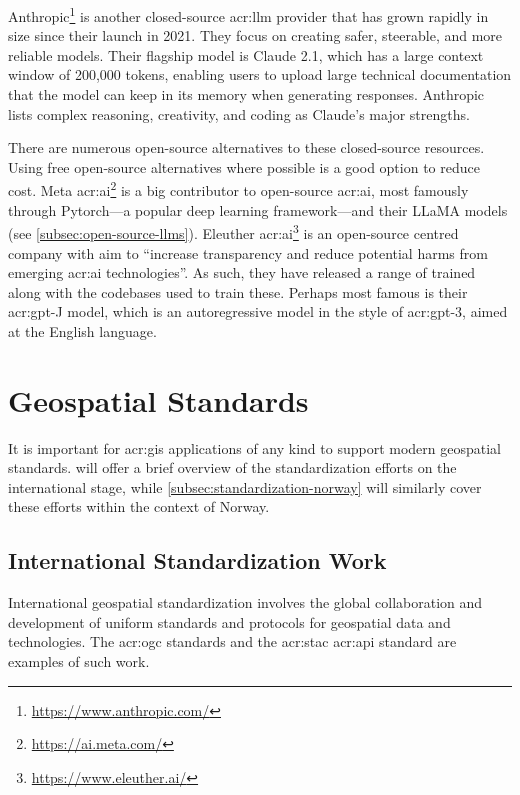 Anthropic\footnote{\url{https://www.anthropic.com/}} is another closed-source \acrshort{acr:llm} provider that has grown rapidly in size since their launch in 2021. They focus on creating safer, steerable, and more reliable models. Their flagship model is Claude 2.1, which has a large context window of 200,000 tokens, enabling users to upload large technical documentation that the model can keep in its memory when generating responses. Anthropic lists complex reasoning, creativity, and coding as Claude's major strengths.

There are numerous open-source alternatives to these closed-source resources. Using free open-source alternatives where possible is a good option to reduce cost. Meta \acrshort{acr:ai}\footnote{\url{https://ai.meta.com/}} is a big contributor to open-source \acrshort{acr:ai}, most famously through Pytorch---a popular deep learning framework---and their LLaMA models (see \autoref{subsec:open-source-llms}). Eleuther \acrshort{acr:ai}\footnote{\url{https://www.eleuther.ai/}} is an open-source centred company with aim to \enquote{increase transparency and reduce potential harms from emerging \acrshort{acr:ai} technologies}. As such, they have released a range of trained  along with the codebases used to train these. Perhaps most famous is their \acrshort{acr:gpt}-J model, which is an autoregressive model in the style of \acrshort{acr:gpt}-3, aimed at the English language.

\section{Geospatial Standards}\label{sec:geospatial-standards}

It is important for \acrshort{acr:gis} applications of any kind to support modern geospatial standards.  will offer a brief overview of the standardization efforts on the international stage, while \autoref{subsec:standardization-norway} will similarly cover these efforts within the context of Norway.

\subsection{International Standardization Work}\label{subsec:standardization-international}

International geospatial standardization involves the global collaboration and development of uniform standards and protocols for geospatial data and technologies. The \acrshort{acr:ogc} standards and the \acrshort{acr:stac} \acrshort{acr:api} standard are examples of such work.

